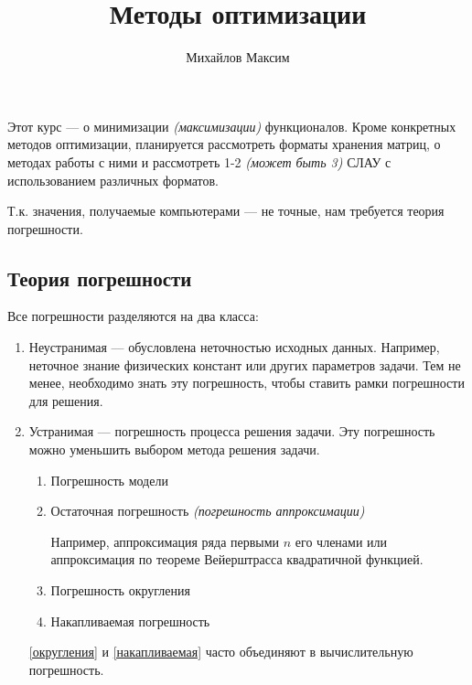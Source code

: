 \documentclass[12pt, a4paper, oneside]{book}
\begin{document}
\title{Методы оптимизации}
\author{Михайлов Максим}

\maketitle

\tableofcontents

\chapter{}

Этот курс --- о минимизации \textit{(максимизации)} функционалов. Кроме конкретных методов оптимизации, планируется рассмотреть форматы хранения матриц, о методах работы с ними и рассмотреть 1-2 \textit{(может быть 3)} СЛАУ с использованием различных форматов.

Т.к. значения, получаемые компьютерами --- не точные, нам требуется теория погрешности.

\section{Теория погрешности}

Все погрешности разделяются на два класса:

\begin{enumerate}
    \item Неустранимая --- обусловлена неточностью исходных данных. Например, неточное знание физических констант или других параметров задачи. Тем не менее, необходимо знать эту погрешность, чтобы ставить рамки погрешности для решения.
    \item Устранимая --- погрешность процесса решения задачи. Эту погрешность можно уменьшить выбором метода решения задачи.
          \begin{enumerate}
              \item Погрешность модели
              \item Остаточная погрешность \textit{(погрешность аппроксимации)}

                    Например, аппроксимация ряда первыми \(n\) его членами или аппроксимация по теореме Вейерштрасса квадратичной функцией.

              \item Погрешность округления \label{округления}
              \item Накапливаемая погрешность \label{накапливаемая}
          \end{enumerate}

          \ref{округления} и \ref{накапливаемая} часто объединяют в вычислительную погрешность.
\end{enumerate}
\end{document}
